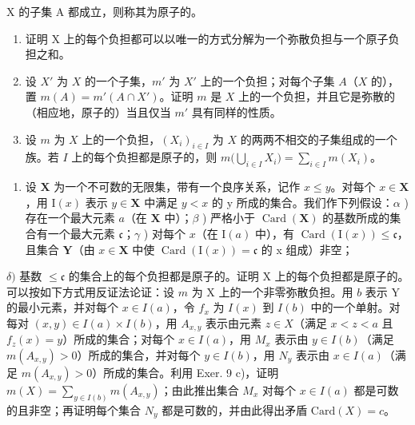 X 的子集 A 都成立，则称其为原子的。

\begin{enumerate}
\def\labelenumi{\alph{enumi})}
\item
  证明 X 上的每个负担都可以以唯一的方式分解为一个弥散负担与一个原子负担之和。
\item
  设 \(X'\) 为 \(X\) 的一个子集，\(m'\) 为 \(X'\) 上的一个负担；对每个子集 \(A\)（\(X\) 的），置 \(m(A) = m'(A \cap X')\)。证明 \(m\) 是 \(X\) 上的一个负担，并且它是弥散的（相应地，原子的）当且仅当 \(m'\) 具有同样的性质。
\item
  设 \(m\) 为 \(X\) 上的一个负担，\((X_i)_{i \in I}\) 为 \(X\) 的两两不相交的子集组成的一个族。若 \(I\) 上的每个负担都是原子的，则 \(m\big(\bigcup_{i \in I} X_i\big) = \sum_{i \in I} m(X_i)\)。
\end{enumerate}

\begin{enumerate}
\def\labelenumi{\arabic{enumi})}
\setcounter{enumi}{9}
\tightlist
\item
  设 \(\mathbf{X}\) 为一个不可数的无限集，带有一个良序关系，记作 \(x \leqslant y\)。对每个 \(x \in \mathbf{X}\)，用 \(\mathrm{I}(x)\) 表示 \(y \in \mathbf{X}\) 中满足 \(y < x\) 的 y 所成的集合。我们作下列假设：\(\alpha\) ) 存在一个最大元素 \(a\)（在 \(\mathbf{X}\) 中）；\(\beta\) ) 严格小于 \(\operatorname{Card}(\mathbf{X})\) 的基数所成的集合有一个最大元素 \(\mathfrak{c}\)；\(\gamma\) ) 对每个 \(x\)（在 \(\mathrm{I}(a)\) 中），有 \(\operatorname{Card}(\mathrm{I}(x)) \leqslant \mathfrak{c}\)，且集合 \(\mathbf{Y}\)（由 \(x \in \mathbf{X}\) 中使 \(\operatorname{Card}(\mathrm{I}(x)) = \mathfrak{c}\) 的 x 组成）非空；
\end{enumerate}

\(\delta)\) 基数 \(\leqslant \mathfrak{c}\) 的集合上的每个负担都是原子的。证明 X 上的每个负担都是原子的。可以按如下方式用反证法论证：设 \(m\) 为 X 上的一个非零弥散负担。用 \(b\) 表示 Y 的最小元素，并对每个 \(x \in I(a)\)，令 \(f_x\) 为 \(I(x)\) 到 \(I(b)\) 中的一个单射。对每对 \((x,y) \in I(a) \times I(b)\)，用 \(A_{x,y}\) 表示由元素 \(z \in X\)（满足 \(x < z < a\) 且 \(f_z(x) = y\)）所成的集合；对每个 \(x \in I(a)\)，用 \(M_x\) 表示由 \(y \in I(b)\)（满足 \(m(A_{x,y}) > 0\)）所成的集合，并对每个 \(y \in I(b)\)，用 \(N_y\) 表示由 \(x \in I(a)\)（满足 \(m(A_{x,y}) > 0\)）所成的集合。利用 Exer. 9 c)，证明 \(m(X) = \sum_{y \in I(b)} m(A_{x,y})\)；由此推出集合 \(M_x\) 对每个 \(x \in I(a)\) 都是可数的且非空；再证明每个集合 \(N_y\) 都是可数的，并由此得出矛盾 \(\text{Card}(X) = c\)。


